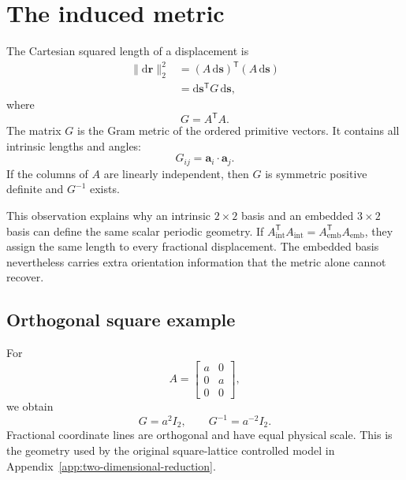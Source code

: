 \section{The induced metric}

The Cartesian squared length of a displacement is
\begin{align}
  \lVert \mathrm{d}\mathbf r\rVert_2^2
  &= (A\,\mathrm{d}\mathbf s)^{\mathsf T}
     (A\,\mathrm{d}\mathbf s) \\
  &= \mathrm{d}\mathbf s^{\mathsf T}G\,\mathrm{d}\mathbf s,
  \label{eq:training-induced-metric}
\end{align}
where
\begin{equation}
  G=A^{\mathsf T}A.
  \label{eq:training-gram-metric}
\end{equation}
The matrix $G$ is the Gram metric of the ordered primitive vectors. It contains
all intrinsic lengths and angles:
\begin{equation}
  G_{ij}=\mathbf a_i\cdot\mathbf a_j.
  \label{eq:training-metric-components}
\end{equation}
If the columns of $A$ are linearly independent, then $G$ is symmetric positive
definite and $G^{-1}$ exists.

This observation explains why an intrinsic $2\times2$ basis and an embedded
$3\times2$ basis can define the same scalar periodic geometry. If
$A_{\mathrm{int}}^{\mathsf T}A_{\mathrm{int}}
=A_{\mathrm{emb}}^{\mathsf T}A_{\mathrm{emb}}$, they assign the same length to
every fractional displacement. The embedded basis nevertheless carries extra
orientation information that the metric alone cannot recover.

\subsection{Orthogonal square example}

For
\begin{equation}
  A=
  \begin{bmatrix}
    a & 0\\
    0 & a\\
    0 & 0
  \end{bmatrix},
  \label{eq:training-square-embedded-basis}
\end{equation}
we obtain
\begin{equation}
  G=a^2I_2,
  \qquad
  G^{-1}=a^{-2}I_2.
  \label{eq:training-square-metric}
\end{equation}
Fractional coordinate lines are orthogonal and have equal physical scale.
This is the geometry used by the original square-lattice controlled model in
Appendix~\ref{app:two-dimensional-reduction}.

